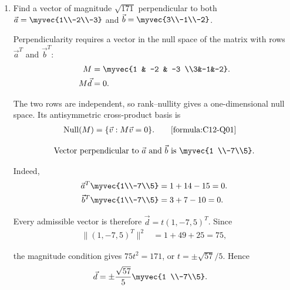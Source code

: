 \begin{enumerate}[label=\thesubsection.\arabic*, ref=\thesubsection.\theenumi]
    \item
    \label{question:C12-Q01}
    \label{question-short:C12-Q01} Find a vector of magnitude $\sqrt{171}$ perpendicular to both $\vec a=\myvec{1\\-2\\-3}$ and $\vec b=\myvec{3\\-1\\-2}$.

    \par
    \smallskip
    \solution

    Perpendicularity requires a vector in the null space of the matrix with rows $\vec a^T$ and $\vec b^T$:
    \begin{align*}
        M       & =\myvec{1 & -2 & -3 \\3&-1&-2}. \\
        M\vec d & =0.
    \end{align*}

    The two rows are independent, so rank--nullity gives a one-dimensional null space. Its antisymmetric cross-product basis is
    \begin{align*}
        \operatorname{Null}(M) & =\{\vec v:M\vec v=0\}.
	    \tag*{\eqref{formula:C12-Q01}}
    \end{align*}

    \par
    \begin{align*}
	    \text{Vector perpendicular to } \vec{a} \text{ and } \vec{b} \text{ is } \myvec{1 \\-7\\5}.
    \end{align*}

    Indeed,
    \begin{align*}
	    \vec a^T\myvec{1\\-7\\5} & =1+14-15=0. \\
	    \vec b^T\myvec{1\\-7\\5} & =3+7-10=0.
    \end{align*}

    Every admissible vector is therefore $\vec d=t(1,-7,5)^T$. Since
    \begin{align*}
        \|(1,-7,5)^T\|^2 & =1+49+25=75,
    \end{align*}

    the magnitude condition gives $75t^2=171$, or $t=\pm\sqrt{57}/5$. Hence
    \begin{align*}
        \vec d & =\pm\frac{\sqrt{57}}5\myvec{1 \\-7\\5}.
    \end{align*}


\end{enumerate}
